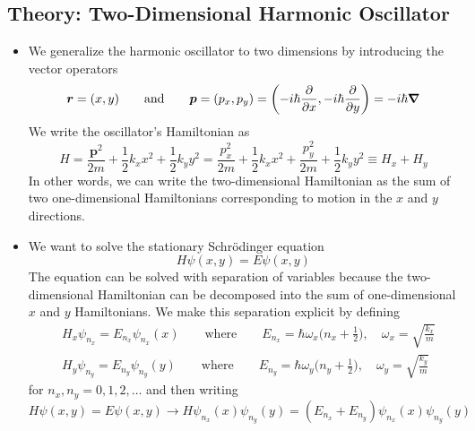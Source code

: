 \documentclass[11pt, a4paper]{article}
\newcommand{\eqtext}[1]{\qquad \text{#1} \qquad}
\newcommand{\Schro}{Schr\"{o}dinger\xspace}
\renewcommand{\vec}[1]{\bm{#1}} %
\begin{document}
\subsection{Theory: Two-Dimensional Harmonic Oscillator}
\begin{itemize}
	\item We generalize the harmonic oscillator to two dimensions by introducing the vector operators
	\begin{equation*}
		\vec{r} = (x, y) \eqtext{and} \vec{p} = (p_{x}, p_{y}) = \left(-i\hbar \pdv{x}, -i \hbar \pdv{y}\right) = -i\hbar \grad
	\end{equation*}
	We write the oscillator's Hamiltonian as
	\begin{equation*}
		H = \frac{\vec{p}^{2}}{2m} + \frac{1}{2}k_{x}x^{2} + \frac{1}{2}k_{y}y^{2} = \frac{p_{x}^{2}}{2m} + \frac{1}{2}k_{x}x^{2} + \frac{p_{y}^{2}}{2m} + \frac{1}{2}k_{y}y^{2} \equiv H_{x} + H_{y}
	\end{equation*}
	In other words, we can write the two-dimensional Hamiltonian as the sum of two one-dimensional Hamiltonians corresponding to motion in the $ x $ and $ y $ directions. 
	
	\item We want to solve the stationary \Schro equation
	\begin{equation*}
		H \psi(x, y) = E\psi(x, y)
	\end{equation*} 
	The equation can be solved with separation of variables because the two-dimensional Hamiltonian can be decomposed into the sum of one-dimensional $ x $ and $ y $ Hamiltonians. We make this separation explicit by defining
	\begin{align*}
		&H_{x}\psi_{n_{x}} = E_{n_{x}}\psi_{n_{x}}(x) \eqtext{where} E_{n_{x}} = \hbar \omega_{x}\big(n_{x} + \tfrac{1}{2}\big), \quad \omega_{x} = \sqrt{\frac{k_{x}}{m}}\\
		&H_{y}\psi_{n_{y}} = E_{n_{y}}\psi_{n_{y}}(y) \eqtext{where} E_{n_{y}} = \hbar \omega_{y}\big(n_{y} + \tfrac{1}{2}\big), \quad \omega_{y} = \sqrt{\frac{k_{y}}{m}}
	\end{align*}
	for $ n_{x}, n_{y} = 0, 1, 2, \ldots $ and then writing
	\begin{equation*}
		H\psi(x,y) = E\psi(x, y) \to H\psi_{n_{x}}(x)\psi_{n_{y}}(y) = (E_{n_{x}} + E_{n_{y}})\psi_{n_{x}}(x)\psi_{n_{y}}(y)
	\end{equation*}
	

\end{itemize}
\end{document}
